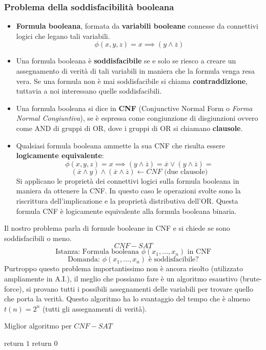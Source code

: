 \documentclass{article}
\begin{document}
\subsubsection{Problema della soddisfacibilità booleana}
\begin{itemize}
    \item \textbf{Formula booleana}, formata da \textbf{variabili booleane} connesse da connettivi logici che legano
          tali variabili.
          $$\phi(x,y,z)=x\implies(y\land \overline{z})$$
    \item Una formula booleana è \textbf{soddisfacibile} se e solo se riesco a creare un assegnamento
          di verità di tali variabili in maniera che la formula venga resa vera. Se una formula non è
          mai soddisfacibile si chiama \textbf{contraddizione}, tuttavia a noi interessano quelle
          soddisfacibili.
    \item Una formula booleana si dice in \textbf{CNF} (Conjunctive Normal Form o \textit{Forma Normal Congiuntiva}),
        se è espressa come congiunzione di disgiunzioni ovvero come AND di gruppi di OR, dove i gruppi di OR si chiamano \textbf{clausole}.
    \item Qualsiasi formula booleana ammette la sua CNF che risulta essere \textbf{logicamente equivalente}:
          $$\phi(x,y,z)=x\implies(y\land\overline{z})=\overline{x}\lor (y\land\overline{z})=$$
          $$(\overline{x}\land y)\land(\overline{x}\land\overline{z})\leftarrow CNF\text{ (due clausole)}$$
          Si applicano le proprietà dei connettivi logici sulla formula booleana in maniera da ottenere
          la CNF. In questo caso le operazioni svolte sono la riscrittura dell'implicazione e la proprietà distributiva
          dell'OR. Questa formula CNF è logicamente equivalente alla formula booleana binaria.
\end{itemize}
Il nostro problema parla di formule booleane in CNF e si chiede se sono soddisfacibili o meno.
$$CNF-SAT$$
$$\text{Istanza: Formula booleana }\phi (x_1,\dots,x_n)\text{ in CNF}$$
$$\text{Domanda: }\phi (x_1,\dots,x_n)\text{ è soddisfacibile?}$$
Purtroppo questo problema importantissimo non è ancora risolto (utilizzato ampliamente in A.I.),
il meglio che possiamo fare è un algoritmo esaustivo (brute-force), si provano tutti i possibili
assegnamenti delle variabili per trovare quello che porta la verità. Questo algoritmo ha lo svantaggio
del tempo che è almeno $t(n)=2^n$ (tutti gli assegnamenti di verità).
\begin{algorithm}[hbt!]
    \caption{Miglior algoritmo per $CNF-SAT$}\label{alg:cnf}
    {
        {
            return $1$\;
        }
    }
    return $0$\;
\end{algorithm}
\end{document}
